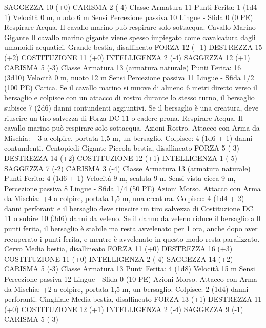 \begin{multicols}{2}
SAGGEZZA 10 (+0)
CARISMA 2 (-4)
Classe Armatura 11
\hspace*{0pt}\hfill{Punti Ferita}: 1 (1d4 - 1)
Velocità 0 m, nuoto 6 m
Sensi Percezione passiva 10
Lingue -
Sfida 0 (0 PE)
Respirare Acqua. Il cavallo marino può respirare solo sottacqua.
Cavallo Marino Gigante
Il cavallo marino gigante viene spesso impiegato come
cavalcatura dagli umanoidi acquatici.
Grande bestia, disallineato
FORZA 12 (+1)
DESTREZZA 15 (+2)
COSTITUZIONE 11 (+0)
INTELLIGENZA 2 (-4)
SAGGEZZA 12 (+1)
CARISMA 5 (-3)
Classe Armatura 13 (armatura naturale)
\hspace*{0pt}\hfill{Punti Ferita}: 16 (3d10)
Velocità 0 m, nuoto 12 m
Sensi Percezione passiva 11
Lingue -
Sfida 1/2 (100 PE)
Carica. Se il cavallo marino si muove di almeno 6 metri diretto
verso il bersaglio e colpisce con un attacco di rostro durante lo
stesso turno, il bersaglio subisce 7 (2d6) danni contundenti
aggiuntivi. Se il bersaglio è una creatura, deve riuscire un tiro
salvezza di Forza DC 11 o cadere prona.
Respirare Acqua. Il cavallo marino può respirare solo sottacqua.
Azioni
Rostro. Attacco con Arma da Mischia: +3 a colpire, portata 1,5
m, un bersaglio.
Colpisce: 4 (1d6 + 1) danni contundenti. 
Centopiedi Gigante
Piccola bestia, disallineato
FORZA 5 (-3)
DESTREZZA 14 (+2)
COSTITUZIONE 12 (+1)
INTELLIGENZA 1 (-5)
SAGGEZZA 7 (-2)
CARISMA 3 (-4)
Classe Armatura 13 (armatura naturale)
\hspace*{0pt}\hfill{Punti Ferita}: 4 (1d6 + 1)
Velocità 9 m, scalata 9 m
Sensi vista cieca 9 m, Percezione passiva 8
Lingue -
Sfida 1/4 (50 PE)
Azioni
Morso. Attacco con Arma da Mischia: +4 a colpire, portata 1,5
m, una creatura.
Colpisce: 4 (1d4 + 2) danni perforanti e il bersaglio deve riuscire
un tiro salvezza di Costituzione DC 11 o subire 10 (3d6) danni
da veleno. Se il danno da veleno riduce il bersaglio a 0 punti
ferita, il bersaglio è stabile ma resta avvelenato per 1 ora, anche
dopo aver recuperato i punti ferita, e mentre è avvelenato in
questo modo resta paralizzato.
Cervo
Media bestia, disallineato
FORZA 11 (+0)
DESTREZZA 16 (+3)
COSTITUZIONE 11 (+0)
INTELLIGENZA 2 (-4)
SAGGEZZA 14 (+2)
CARISMA 5 (-3)
Classe Armatura 13
\hspace*{0pt}\hfill{Punti Ferita}: 4 (1d8)
Velocità 15 m
Sensi Percezione passiva 12
Lingue -
Sfida 0 (10 PE)
Azioni
Morso. Attacco con Arma da Mischia: +2 a colpire, portata 1,5
m, un bersaglio.
Colpisce: 2 (1d4) danni perforanti.
Cinghiale
Media bestia, disallineato
FORZA 13 (+1)
DESTREZZA 11 (+0)
COSTITUZIONE 12 (+1)
INTELLIGENZA 2 (-4)
SAGGEZZA 9 (-1)
CARISMA 5 (-3)

\end{multicols}
